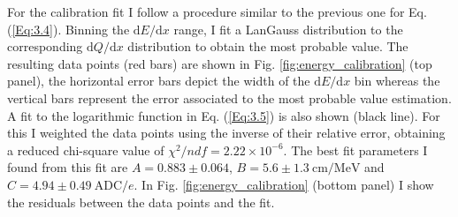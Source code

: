 For the calibration fit I follow a procedure similar to the previous one for Eq. (\ref{Eq:3.4}). Binning the $\mathrm{d}E/\mathrm{d}x$ range, I fit a LanGauss distribution to the corresponding $\mathrm{d}Q/\mathrm{d}x$ distribution to obtain the most probable value. The resulting data points (red bars) are shown in Fig. \ref{fig:energy_calibration} (top panel), the horizontal error bars depict the width of the $\mathrm{d}E/\mathrm{d}x$ bin whereas the vertical bars represent the error associated to the most probable value estimation. A fit to the logarithmic function in Eq. (\ref{Eq:3.5}) is also shown (black line). For this I weighted the data points using the inverse of their relative error, obtaining a reduced chi-square value of $\chi^{2}/ndf=2.22\times10^{-6}$. The best fit parameters I found from this fit are $A = 0.883 \pm 0.064$, $B=5.6\pm1.3~\mathrm{cm}/\mathrm{MeV}$ and $C = 4.94 \pm 0.49 \ \mathrm{ADC}/e$. In Fig. \ref{fig:energy_calibration} (bottom panel) I show the residuals between the data points and the fit.

